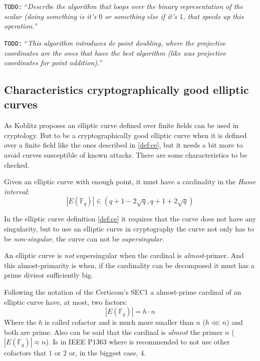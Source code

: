 \documentclass[10pt,a4paper,twoside]{llncs}
\newcommand{\todo}[1]{\texttt{\color{red}TODO:} ``\emph{#1}''}
\newcommand{\EFq}{\ensuremath{E(\mathbb{F}_q)}}%
\begin{document}
\todo{Describe the algorithm that loops over the binary representation of the scalar (doing something is it's $0$ or something else if it's $1$, that speeds up this operation.}

\todo{This algorithm introduces de \emph{point doubling}, where the projective coordinates are the ones that have the best algorithm (like was projective coordinates for point addition).}

\subsection{Characteristics cryptographically good elliptic curves \label{sec:good_ce}}

As Koblitz proposes \cite{Koblitz87ecc} an elliptic curve defined over finite fields can be used in cryptology. But to be a cryptographically good elliptic curve when it is defined over a finite field like the ones described in \ref{def:ce}, but it needs a bit more to avoid curves susceptible of known attacks. There are some characteristics to be checked.


\begin{definition}\label{def:Hasse}
 Given an elliptic curve with enough point, it must have a cardinality in the \emph{Hasse interval}:
\begin{equation}\label{eq:hasse}
| \EFq | \in \left( q+1-2\sqrt{q} , q+1+2\sqrt{q} \right)
\end{equation}
\end{definition}


In the elliptic curve definition \ref{def:ce} it requires that the curve does not have any singularity, but to use an elliptic curve in cryptography the curve not only has to be \emph{non-singular}, the curve can not be \emph{supersingular}.

\begin{definition}\label{def:nonsupersing}
 An elliptic curve is \emph{not} supersingular when the cardinal is \emph{almost}-primer. And this almost-primarity is when, if the cardinality can be decomposed it must has a prime divisor sufficiently big.
\end{definition}

Following the notation of the Certicom's SEC1 \cite{sec1} a almost-prime cardinal of an elliptic curve have, at most, two factors:
\begin{equation}\label{amostprime}
| \EFq | = h \cdot n
\end{equation}
Where the $h$ is called cofactor and is much more smaller than $n$ ($h \lll n$) and both are prime. Also can be said that the cardinal is \emph{almost} the primer $n$ ($|\EFq| \approx n$). Is in IEEE P1363 \cite{P1363} where is recommended to not use other cofactors that $1$ or $2$ or, in the biggest case, $4$.
\end{document}
